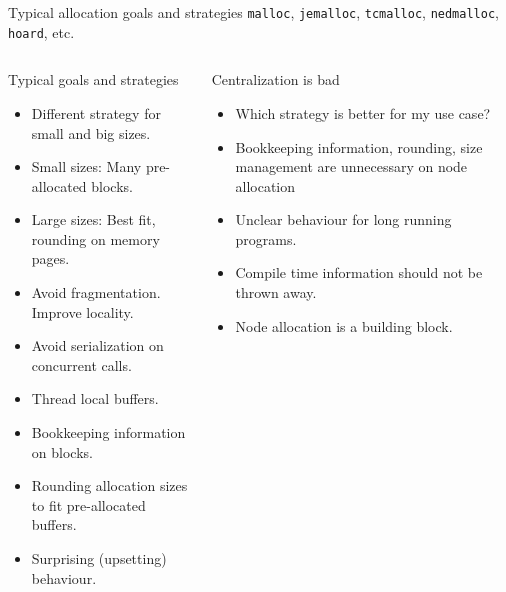 \documentclass[10pt,aspectratio=169]{beamer}
\begin{document}
\begin{frame}{Typical allocation goals and strategies}
{\texttt{malloc}, \texttt{jemalloc}, \texttt{tcmalloc},
\texttt{nedmalloc}, \texttt{hoard}, etc.}
\begin{columns}
\begin{column}{0.47\textwidth}
\begin{block} {Typical goals and strategies}
\begin{itemize}
\item Different strategy for small and big sizes.
\item Small sizes: Many pre-allocated blocks.
\item Large sizes: Best fit, rounding on memory pages.
\item Avoid fragmentation. Improve locality.
\item Avoid serialization on concurrent calls.
\item Thread local buffers.
\item Bookkeeping information on blocks.
\item Rounding allocation sizes to fit pre-allocated buffers.
\item Surprising (upsetting) behaviour.
\end{itemize}
\end{block}
\end{column}

\begin{column}{0.47\textwidth}
\begin{block} {Centralization is bad}
\begin{itemize}
\item Which strategy is better for my use case?
\item Bookkeeping information, rounding, size management
are unnecessary on node allocation
\item Unclear behaviour for long running programs.
\item Compile time information should not be thrown away.
\item<alert@1> Node allocation is a building block.
\end{itemize}
\end{block}

\end{column}
\end{columns}
\end{frame}
\end{document}
